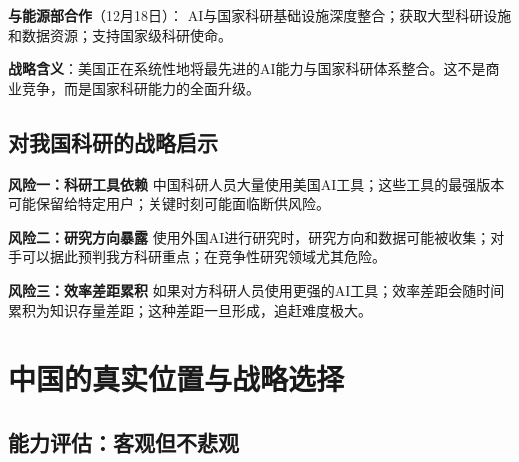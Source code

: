 \textbf{与能源部合作}（12月18日）：
AI与国家科研基础设施深度整合；获取大型科研设施和数据资源；支持国家级科研使命。

\textbf{战略含义}：美国正在系统性地将最先进的AI能力与国家科研体系整合。这不是商业竞争，而是国家科研能力的全面升级。

\subsection{对我国科研的战略启示}

\textbf{风险一：科研工具依赖}
中国科研人员大量使用美国AI工具；这些工具的最强版本可能保留给特定用户；关键时刻可能面临断供风险。

\textbf{风险二：研究方向暴露}
使用外国AI进行研究时，研究方向和数据可能被收集；对手可以据此预判我方科研重点；在竞争性研究领域尤其危险。

\textbf{风险三：效率差距累积}
如果对方科研人员使用更强的AI工具；效率差距会随时间累积为知识存量差距；这种差距一旦形成，追赶难度极大。

\section{中国的真实位置与战略选择}

\subsection{能力评估：客观但不悲观}

